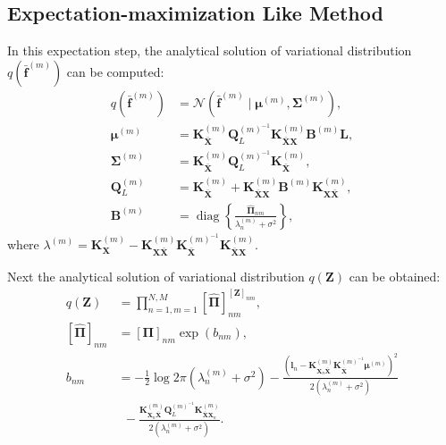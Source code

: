 \documentclass[sn-mathphys-num]{sn-jnl}
\begin{document}
\subsection{Expectation-maximization Like Method}
In this expectation step, the analytical solution of variational distribution $q(\bar{\mathbf{f}}^{(m)})$ can be computed:
\begin{align}\label{eq:analytical:qf}
    q(\bar{\mathbf{f}}^{(m)}) & =\mathcal{N}(\bar{\mathbf{f}}^{(m)} \mid \boldsymbol{\mu}^{(m)}, \boldsymbol{\Sigma}^{(m)}), \nonumber \\
    \boldsymbol{\mu}^{(m)} & =\mathbf{K}_{\bar{\mathbf{X}}}^{(m)} \mathbf{Q}_L^{(m)^{-1}} \mathbf{K}_{\bar{\mathbf{X}} \mathbf{X}}^{(m)} \mathbf{B}^{(m)} \mathbf{L}, \nonumber \\
    \boldsymbol{\Sigma}^{(m)} & =\mathbf{K}_{\bar{\mathbf{X}}}^{(m)} \mathbf{Q}_L^{(m)^{-1}} \mathbf{K}_{\bar{\mathbf{X}}}^{(m)}, \nonumber \\
    \mathbf{Q}_L^{(m)} & =\mathbf{K}_{\bar{\mathbf{X}}}^{(m)}+\mathbf{K}_{\bar{\mathbf{X}} \mathbf{X}}^{(m)} \mathbf{B}^{(m)} \mathbf{K}_{\mathbf{X} \bar{\mathbf{X}}}^{(m)}, \nonumber \\
    \mathbf{B}^{(m)} & =\operatorname{diag}\left\{\frac{\hat{\mathbf{\Pi}}_{n m}}{\lambda_n^{(m)}+\sigma^2}\right\} ,
\end{align}
where $\lambda^{(m)}\!=\!\mathbf{K}^{(m)}_{\boldsymbol{X}}-\mathbf{K}^{(m)}_{\mathbf{X} \bar{\mathbf{X}}} \mathbf{K}_{\bar{\mathbf{X}}}^{(m)^{-1}} \mathbf{K}^{(m)}_{\bar{\mathbf{X}} \mathbf{X}}$. 

Next the analytical solution of variational distribution $q\left(\mathbf{Z}\right)$ can be obtained:
\begin{align}\label{eq:analytical:qz}
    q(\mathbf{Z}) & =\prod_{n=1, m=1}^{N, M} [\hat{\boldsymbol{\Pi}}]_{n m}^{[\mathbf{Z}]_{n m}}, \nonumber \\
    [\hat{\boldsymbol{\Pi}}]_{n m} &= [\boldsymbol{\Pi}]_{n m} \exp \left(b_{n m}\right), \nonumber \\
    b_{n m} & =-\frac{1}{2} \log 2 \pi(\lambda_n^{(m)}+\sigma^2) 
     -\frac{\left(\mathbf{l}_n- \mathbf{K}_{\mathbf{X}_n \bar{\mathbf{X}}}^{(m)} \mathbf{K}_{\bar{\mathbf{X}}}^{(m)^{-1}} \boldsymbol{\mu}^{(m)}\right)^2}{2(\lambda_n^{(m)}+\sigma^2)} \nonumber \\
    &~~ -\frac{\mathbf{K}_{\mathbf{X}_n \bar{\mathbf{X}}}^{(m)} \mathbf{Q}_L^{(m)^{-1}} \mathbf{K}_{\bar{\mathbf{X}} \mathbf{X}_n}^{(m)}}{2(\lambda_n^{(m)}+\sigma^2)}. 
\end{align}
 
\end{document}
